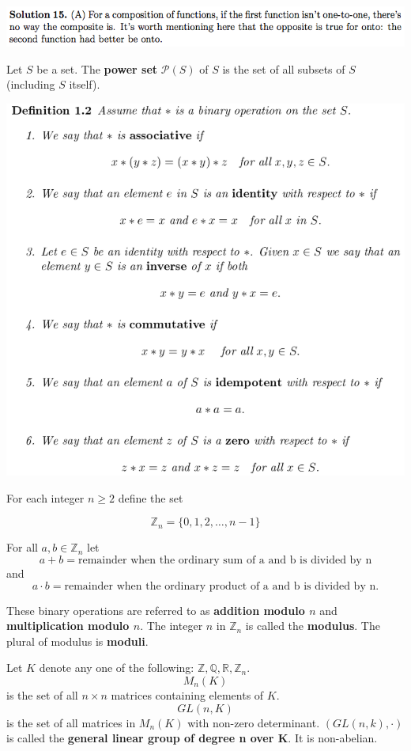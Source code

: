 \documentclass{article}
\begin{document}
\includegraphics[scale=0.65]{1268_15s}

Let \(S\) be a set. The \textbf{power set} \(\mathcal{P}(S)\) of \(S\) is the set of all subsets of \(S\) (including \(S\) itself).

\includegraphics[scale=0.45]{binary_operation2}

\pagebreak

For each integer \(n \geq 2\) define the set

\[
\mathbb{Z}_n = \{0, 1, 2, \ldots, n-1\}
\]

For all \(a, b \in \mathbb{Z}_n\) let \[a + b = \text{remainder when the ordinary sum of a and b is divided by n}\] and \[a \cdot b = \text{remainder when the ordinary product of a and b is divided by n.}\]

These binary operations are referred to as \textbf{addition modulo \(n\)} and \textbf{multiplication modulo \(n\)}. The integer \(n\) in \(\mathbb{Z}_n\) is called the \textbf{modulus}. The plural of modulus is \textbf{moduli}.

Let \(K\) denote any one of the following: \(\mathbb{Z}, \mathbb{Q}, \mathbb{R}, \mathbb{Z}_n\). \[M_n(K)\] is the set of all \(n \times n\) matrices containing elements of \(K\). \[GL(n, K)\] is the set of all matrices in \(M_{n}(K)\) with non-zero determinant. \((GL(n, k), \cdot)\) is called the \textbf{general linear group of degree n over K}. It is non-abelian.
\end{document}
